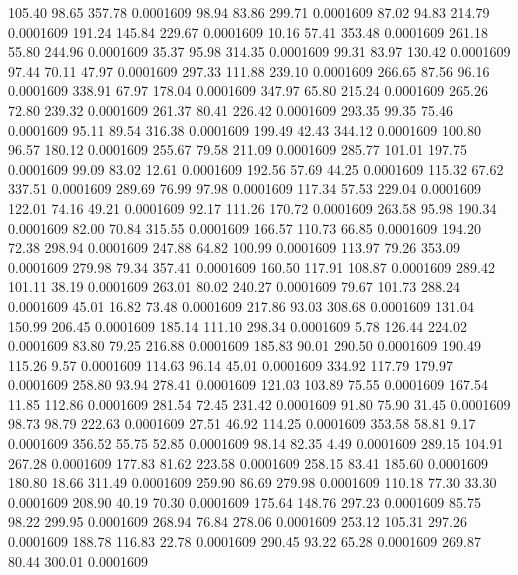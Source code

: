  105.40   98.65  357.78   0.0001609
  98.94   83.86  299.71   0.0001609
  87.02   94.83  214.79   0.0001609
 191.24  145.84  229.67   0.0001609
  10.16   57.41  353.48   0.0001609
 261.18   55.80  244.96   0.0001609
  35.37   95.98  314.35   0.0001609
  99.31   83.97  130.42   0.0001609
  97.44   70.11   47.97   0.0001609
 297.33  111.88  239.10   0.0001609
 266.65   87.56   96.16   0.0001609
 338.91   67.97  178.04   0.0001609
 347.97   65.80  215.24   0.0001609
 265.26   72.80  239.32   0.0001609
 261.37   80.41  226.42   0.0001609
 293.35   99.35   75.46   0.0001609
  95.11   89.54  316.38   0.0001609
 199.49   42.43  344.12   0.0001609
 100.80   96.57  180.12   0.0001609
 255.67   79.58  211.09   0.0001609
 285.77  101.01  197.75   0.0001609
  99.09   83.02   12.61   0.0001609
 192.56   57.69   44.25   0.0001609
 115.32   67.62  337.51   0.0001609
 289.69   76.99   97.98   0.0001609
 117.34   57.53  229.04   0.0001609
 122.01   74.16   49.21   0.0001609
  92.17  111.26  170.72   0.0001609
 263.58   95.98  190.34   0.0001609
  82.00   70.84  315.55   0.0001609
 166.57  110.73   66.85   0.0001609
 194.20   72.38  298.94   0.0001609
 247.88   64.82  100.99   0.0001609
 113.97   79.26  353.09   0.0001609
 279.98   79.34  357.41   0.0001609
 160.50  117.91  108.87   0.0001609
 289.42  101.11   38.19   0.0001609
 263.01   80.02  240.27   0.0001609
  79.67  101.73  288.24   0.0001609
  45.01   16.82   73.48   0.0001609
 217.86   93.03  308.68   0.0001609
 131.04  150.99  206.45   0.0001609
 185.14  111.10  298.34   0.0001609
   5.78  126.44  224.02   0.0001609
  83.80   79.25  216.88   0.0001609
 185.83   90.01  290.50   0.0001609
 190.49  115.26    9.57   0.0001609
 114.63   96.14   45.01   0.0001609
 334.92  117.79  179.97   0.0001609
 258.80   93.94  278.41   0.0001609
 121.03  103.89   75.55   0.0001609
 167.54   11.85  112.86   0.0001609
 281.54   72.45  231.42   0.0001609
  91.80   75.90   31.45   0.0001609
  98.73   98.79  222.63   0.0001609
  27.51   46.92  114.25   0.0001609
 353.58   58.81    9.17   0.0001609
 356.52   55.75   52.85   0.0001609
  98.14   82.35    4.49   0.0001609
 289.15  104.91  267.28   0.0001609
 177.83   81.62  223.58   0.0001609
 258.15   83.41  185.60   0.0001609
 180.80   18.66  311.49   0.0001609
 259.90   86.69  279.98   0.0001609
 110.18   77.30   33.30   0.0001609
 208.90   40.19   70.30   0.0001609
 175.64  148.76  297.23   0.0001609
  85.75   98.22  299.95   0.0001609
 268.94   76.84  278.06   0.0001609
 253.12  105.31  297.26   0.0001609
 188.78  116.83   22.78   0.0001609
 290.45   93.22   65.28   0.0001609
 269.87   80.44  300.01   0.0001609
